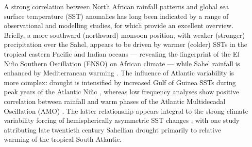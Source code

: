 \documentclass[a4paper]{article}
\begin{document}
A strong correlation between North African rainfall patterns and global sea surface temperature (SST) anomalies has long been indicated by a range of observational and modelling studies, for which \citeauthor{rodriguez2015variability} \parencite{rodriguez2015variability} provide an excellent overview.
Briefly, a more southward (northward) monsoon position, with weaker (stronger) precipitation over the Sahel, appears to be driven by warmer (colder) SSTs in the tropical eastern Pacific \parencite{rowell1995variability, fontaine1996sea, rowell2001teleconnections, janicot2001summer, giannini2003oceanic} and Indian \parencite{rowell1995variability, fontaine1996sea, bader2003impact, giannini2003oceanic} oceans --- revealing the fingerprint of the El Ni\~{n}o Southern Oscillation (ENSO) on African climate \parencite{janowiak1988investigation, rowell1995variability, ward1998diagnosis} --- while Sahel rainfall is enhanced by Mediterranean warming \parencite{rowell2003impact, gaetani2010influence, fontaine2010impacts}.
The influence of Atlantic variability is more complex: drought is intensified by increased Gulf of Guinea SSTs during peak years of the Atlantic Ni\~{n}o \parencite{lamb1978case, bah1987towards, rowell1995variability, fontaine1996sea, ward1998diagnosis, giannini2003oceanic}, whereas low frequency analyses show positive correlation between rainfall and warm phases of the Atlantic Multidecadal Oscillation (AMO) \parencite{zhang2006impact, martin2014impact}.
The latter relationship appears integral to the strong climate variability forcing of hemispherically asymmetric SST changes \parencite{folland1986sahel, lamb1978large, rowell1995variability, fontaine1998evolution, ward1998diagnosis}, with one study \parencite{hoerling2006detection} attributing late twentieth century Sahellian drought primarily to relative warming of the tropical South Atlantic. 
\end{document}

